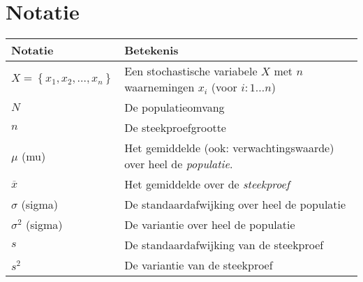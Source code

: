 \chapter{Notatie}
\label{app:notatie}

\begin{table}
  \centering
  \begin{tabular}{p{}p{}}
  	\toprule
  	\textbf{Notatie}                                        & \textbf{Betekenis}                                                                                                                     \\ \midrule
  	$X = \left\{x_1, x_2, \ldots, x_n \right\}$             & Een stochastische variabele $X$ met $n$ waarnemingen $x_i$ (voor $i: 1 \ldots n$)                                                      \\
  	$N$                                                     & De populatieomvang                                                                                                                     \\
  	$n$                                                     & De steekproefgrootte                                                                                                                   \\
  	$\mu$ (mu)                                              & Het gemiddelde (ook: verwachtingswaarde) over heel de \emph{populatie}.                                                                \\
  	$\overline{x}$                                          & Het gemiddelde over de \emph{steekproef}                                                                                               \\
  	$\sigma$ (sigma)                                        & De standaardafwijking over heel de populatie                                                                                           \\
  	$\sigma^2$ (sigma)                                      & De variantie over heel de populatie                                                                                                    \\
  	$s$                                                     & De standaardafwijking van de steekproef                                                                                                \\
  	$s^2$                                                   & De variantie van de steekproef                                                                                                         \\

\end{tabular}
\end{table}
